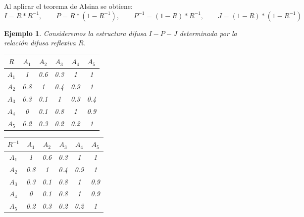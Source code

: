 \documentclass[a5paper,doc,10pt,noapacite]{apa6}
\newtheorem{ejem}{Ejemplo}
\begin{document}
{{Al aplicar el teorema de Alsina se obtiene:
\[
	I = R*R^{-1}, \qquad P = R*(1-R^{-1}), \qquad P^{-1} = (1-R)*R^{-1}, \qquad J = (1-R)*(1-R^{-1})
\]

\newpage

\begin{ejem} Consideremos la estructura difusa \(I-P-J\) determinada por la relación difusa reflexiva \(R\).

\begin{table}[H]
	\fontsize{7}{11}\selectfont
    \begin{minipage}{.5\linewidth}
      \centering
	\begin{tabular}{c|ccccc} \thickline
	\(R\) & \(A_1\) & \(A_2\) & \(A_3\) & \(A_4\) & \(A_5\)  \\ \hline
    \(A_1\) & 1 & 0.6 & 0.3 & 1 & 1  \\
    \(A_2\) & 0.8 & 1 & 0.4 & 0.9 & 1  \\
	\(A_3\) & 0.3 & 0.1 & 1 & 0.3 & 0.4   \\
	\(A_4\) & 0 & 0.1 & 0.8 & 1 & 0.9   \\
	\(A_5\) & 0.2 & 0.3 & 0.2 & 0.2 & 1   \\
\end{tabular}
\label{tab:B2} 
    \end{minipage}%
    \begin{minipage}{.5\linewidth}
      \centering
	\begin{tabular}{c|ccccc} \thickline
	\(R^{-1}\) & \(A_1\) & \(A_2\) & \(A_3\) & \(A_4\) & \(A_5\)  \\ \hline
    \(A_1\) & 1 & 0.6 & 0.3 & 1 & 1  \\
    \(A_2\) & 0.8 & 1 & 0.4 & 0.9 & 1  \\
	\(A_3\) & 0.3 & 0.1 & 0.8 & 1 & 0.9   \\
	\(A_4\) & 0 & 0.1 & 0.8 & 1 & 0.9   \\
	\(A_5\) & 0.2 & 0.3 & 0.2 & 0.2 & 1   \\
\end{tabular}
\label{tab:B3}
    \end{minipage} 
\end{table}
%


\end{ejem}}}
\end{document}
